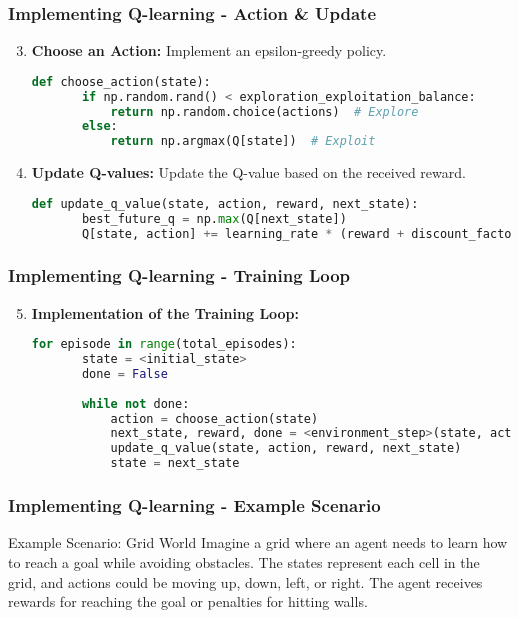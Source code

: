 \documentclass[aspectratio=169]{beamer}
\begin{document}
\begin{frame}[fragile]
    \frametitle{Implementing Q-learning - Action & Update}
    \begin{enumerate}
        \setcounter{enumi}{2}
        \item \textbf{Choose an Action:} Implement an epsilon-greedy policy.
        \begin{lstlisting}[language=Python]
   def choose_action(state):
       if np.random.rand() < exploration_exploitation_balance:
           return np.random.choice(actions)  # Explore
       else:
           return np.argmax(Q[state])  # Exploit
        \end{lstlisting}

        \item \textbf{Update Q-values:} Update the Q-value based on the received reward.
        \begin{lstlisting}[language=Python]
   def update_q_value(state, action, reward, next_state):
       best_future_q = np.max(Q[next_state])
       Q[state, action] += learning_rate * (reward + discount_factor * best_future_q - Q[state, action])
        \end{lstlisting}
    \end{enumerate}
\end{frame}

\begin{frame}[fragile]
    \frametitle{Implementing Q-learning - Training Loop}
    \begin{enumerate}
        \setcounter{enumi}{4}
        \item \textbf{Implementation of the Training Loop:}
        \begin{lstlisting}[language=Python]
   for episode in range(total_episodes):
       state = <initial_state>
       done = False
       
       while not done:
           action = choose_action(state)
           next_state, reward, done = <environment_step>(state, action)
           update_q_value(state, action, reward, next_state)
           state = next_state
        \end{lstlisting}
    \end{enumerate}
\end{frame}

\begin{frame}
    \frametitle{Implementing Q-learning - Example Scenario}
    \begin{block}{Example Scenario: Grid World}
        Imagine a grid where an agent needs to learn how to reach a goal while avoiding obstacles.
        The states represent each cell in the grid, and actions could be moving up, down, left, or right. The agent receives rewards for reaching the goal or penalties for hitting walls.
    \end{block}
\end{frame}
\end{document}

